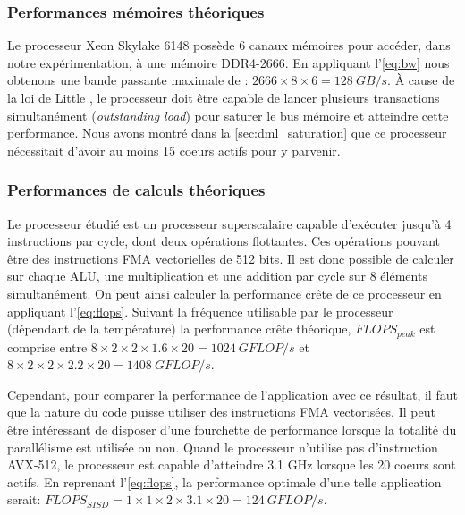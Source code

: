     
    

    \subsubsection{Performances mémoires théoriques}
        Le processeur Xeon Skylake 6148 possède 6 canaux mémoires pour accéder, dans notre expérimentation, à une mémoire DDR4-2666. En appliquant l'\autoref{eq:bw} nous obtenons une bande passante maximale de : $2666 \times 8 \times 6 = 128\ GB/s$. À cause de la loi de Little \cite{little2008little}, le processeur doit être capable de lancer plusieurs transactions simultanément (\textit{outstanding load}) pour saturer le bus mémoire et  atteindre cette performance. Nous avons montré dans la \autoref{sec:dml_saturation} que ce processeur nécessitait d'avoir au moins 15 coeurs actifs pour y parvenir.
        
    

    \subsubsection{Performances de calculs théoriques}
        Le processeur étudié est un processeur superscalaire capable d'exécuter jusqu'à 4 instructions par cycle, dont deux opérations flottantes. Ces opérations pouvant être des instructions FMA vectorielles de 512 bits. Il est donc possible de calculer sur chaque ALU, une multiplication et une addition par cycle sur 8 éléments simultanément. On peut ainsi calculer la performance crête de ce processeur en appliquant l'\autoref{eq:flops}. Suivant la fréquence utilisable par le processeur (dépendant de la température) la performance crête théorique, $FLOPS_{peak}$ est comprise entre $8 \times 2 \times 2 \times 1.6 \times 20 = 1024\ GFLOP/s$ et  $8 \times 2 \times 2 \times 2.2 \times 20 = 1408\ GFLOP/s$. 
        
        Cependant, pour comparer la performance de l'application avec ce résultat, il faut que la nature du code puisse utiliser des instructions FMA vectorisées. Il peut être intéressant de disposer d'une fourchette de performance lorsque la totalité du parallélisme est utilisée ou non. Quand le processeur n'utilise pas d'instruction AVX-512, le processeur est capable d'atteindre 3.1 GHz lorsque les 20 coeurs sont actifs. En reprenant l'\autoref{eq:flops}, la performance optimale d'une telle application serait: $FLOPS_{SISD} = 1 \times 1 \times 2 \times 3.1 \times 20 = 124 \ GFLOP/s$.
    

